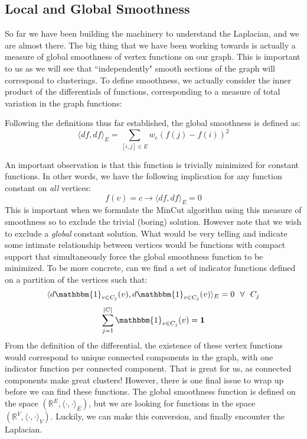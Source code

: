 \subsection{Local and Global Smoothness}
So far we have been building the machinery to understand the
Laplacian, and we are almost there. The big thing that we have been
working towards is actually a measure of global smoothness of vertex
functions on our graph. This is important to us as we will see that
``independently" smooth sections of the graph will correspond to
clusterings. To define smoothness, we actually consider the inner
product of the differentials of functions, corresponding to a measure
of total variation in the graph functions: 
\begin{definition}
Following the definitions thus far established, the global smoothness
is defined as: \[\langle df, df \rangle_E = \sum_{[i,j] \in E}w_e(f(j)
-f(i))^2\] 
\end{definition}
An important observation is that this function is trivially minimized
for constant functions. In other words, we have the following
implication for any function constant on \textit{all} vertices: 
\[
f(v) = c \rightarrow \langle df, df \rangle_E = 0
\]
This is important when we formulate the MinCut algorithm using this
measure of smoothness so to exclude the trivial (boring)
solution. However note that we wish to exclude a \textit{global}
constant solution. What would be very telling and indicate some
intimate relationship between vertices would be functions with compact
support that simultaneously force the global smoothness function to be
minimized. To be more concrete, can we find a set of indicator
functions defined on a partition of the vertices such that: 
\[
\langle d\mathbbm{1}_{v \in C_j}(v), d\mathbbm{1}_{v \in C_j}(v)
\rangle_E = 0 \: \: \: \forall \: \: \: C_j 
\]
\[
\sum_{j=1}^{|C|} \mathbbm{1}_{v \in C_j}(v) = \mathbf{1}
\]
From the definition of the differential, the existence of these vertex
functions would correspond to unique connected components in the
graph, with one indicator function per connected component. That is
great for us, as connected components make great clusters! However,
there is one final issue to wrap up before we can find these
functions. The global smoothness function is defined on the space
\((\mathbb{R}^E, \langle \cdot, \cdot \rangle_E)\), but we are looking
for functions in the space \((\mathbb{R}^V, \langle \cdot, \cdot
\rangle_V)\). Luckily, we can make this conversion, and finally
encounter the Laplacian.

